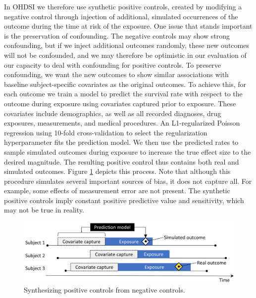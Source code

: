 \documentclass[11pt]{book}
\begin{document}
In OHDSI we therefore use synthetic positive controls,
\citep{schuemie_2018} created by modifying a negative control through
injection of additional, simulated occurrences of the outcome during the
time at risk of the exposure. One issue that stands important is the
preservation of confounding. The negative controls may show strong
confounding, but if we inject additional outcomes randomly, these new
outcomes will not be confounded, and we may therefore be optimistic in
our evaluation of our capacity to deal with confounding for positive
controls. To preserve confounding, we want the new outcomes to show
similar associations with baseline subject-specific covariates as the
original outcomes. To achieve this, for each outcome we train a model to
predict the survival rate with respect to the outcome during exposure
using covariates captured prior to exposure. These covariates include
demographics, as well as all recorded diagnoses, drug exposures,
measurements, and medical procedures. An L1-regularized Poisson
regression \citep{suchard_2013} using 10-fold cross-validation to select
the regularization hyperparameter fits the prediction model. We then use
the predicted rates to sample simulated outcomes during exposure to
increase the true effect size to the desired magnitude. The resulting
positive control thus contains both real and simulated outcomes. Figure
\ref{fig:posControlSynth} depicts this process. Note that although this
procedure simulates several important sources of bias, it does not
capture all. For example, some effects of measurement error are not
present. The synthetic positive controls imply constant positive
predictive value and sensitivity, which may not be true in reality.

\begin{figure}

{\centering \includegraphics[width=0.9\linewidth]{images/MethodValidity/posControlSynth} 

}

\caption{Synthesizing positive controls from negative controls.}\label{fig:posControlSynth}
\end{figure}
\end{document}
